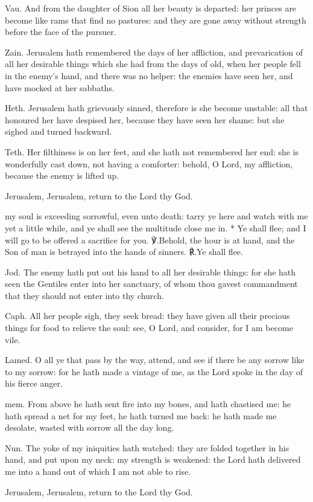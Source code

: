 \documentclass[12pt]{book}
\begin{document}
\begin{enpars}
Vau. And from the daughter of Sion all her beauty is departed: her princes are become like rams that find no pastures: and they are gone away without strength before the face of the pursuer.

Zain. Jerusalem hath remembered the days of her affliction, and prevarication of all her desirable things which she had from the days of old, when her people fell in the enemy's hand, and there was no helper: the enemies have seen her, and have mocked at her sabbaths.

Heth. Jerusalem hath grievously sinned, therefore is she become unstable: all that honoured her have despised her, because they have seen her shame: but she sighed and turned backward.

Teth. Her filthiness is on her feet, and she hath not remembered her end: she is wonderfully cast down, not having a comforter: behold, O Lord, my affliction, because the enemy is lifted up.

Jerusalem, Jerusalem, return to the Lord thy God.
\end{enpars}

\begin{enpars}
my soul is exceeding sorrowful, even unto death: tarry ye here and watch with me yet a little while, and ye shall see the multitude close me in. * Ye shall flee; and I will go to be offered a sacrifice for you.
℣.\@ Behold, the hour is at hand, and the Son of man is betrayed into the hands of sinners.
℟.\@ Ye shall flee.
\end{enpars}

\begin{enpars}
Jod. The enemy hath put out his hand to all her desirable things: for she hath seen the Gentiles enter into her sanctuary, of whom thou gavest commandment that they should not enter into thy church.

Caph. All her people sigh, they seek bread: they have given all their precious things for food to relieve the soul: see, O Lord, and consider, for I am become vile.

Lamed. O all ye that pass by the way, attend, and see if there be any sorrow like to my sorrow: for he hath made a vintage of me, as the Lord spoke in the day of his fierce anger.

mem. From above he hath sent fire into my bones, and hath chastised me: he hath spread a net for my feet, he hath turned me back: he hath made me desolate, wasted with sorrow all the day long.

Nun. The yoke of my iniquities hath watched: they are folded together in his hand, and put upon my neck: my strength is weakened: the Lord hath delivered me into a hand out of which I am not able to rise.

Jerusalem, Jerusalem, return to the Lord thy God.
\end{enpars}
\end{document}
